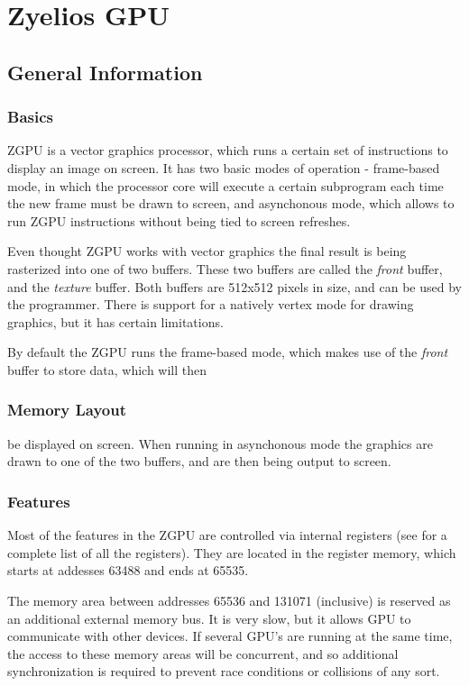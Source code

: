 \chapter{Zyelios GPU}
\section{General Information}
\subsection{Basics}
ZGPU is a vector graphics processor, which runs a certain set of instructions to display an image on screen. It has two basic modes of operation - frame-based mode, in which the processor core will execute a certain subprogram each time the new frame must be drawn to screen, and asynchonous mode, which allows to run ZGPU instructions without being tied to screen refreshes.

Even thought ZGPU works with vector graphics the final result is being rasterized into one of two buffers. These two buffers are called the \emph{front} buffer, and the \emph{texture} buffer. Both buffers are 512x512 pixels in size, and can be used by the programmer. There is support for a natively vertex mode for drawing graphics, but it has certain limitations.

By default the ZGPU runs the frame-based mode, which makes use of the \emph{front} buffer to store data, which will then\subsection{Memory Layout}be displayed on screen. When running in asynchonous mode the graphics are drawn to one of the two buffers, and are then being output to screen.

\subsection{Features}
Most of the features in the ZGPU are controlled via internal registers (see \pageref{gpuregs} for a complete list of all the registers). They are located in the register memory, which starts at addesses 63488 and ends at 65535.

The memory area between addresses 65536 and 131071 (inclusive) is reserved as an additional external memory bus. It is very slow, but it allows GPU to communicate with other devices. If several GPU's are running at the same time, the access to these memory areas will be concurrent, and so additional synchronization is required to prevent race conditions or collisions of any sort.

